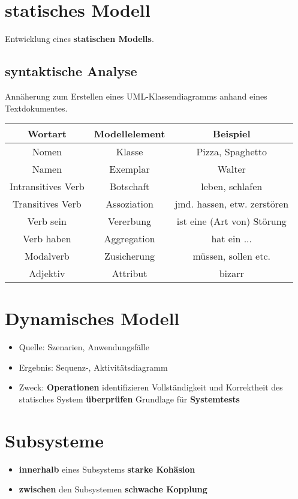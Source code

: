 \documentclass[a4paper]{article}
\theoremstyle{break}
\begin{document}
\section{statisches Modell}
Entwicklung eines \textbf{statischen Modells}. 
\subsection{syntaktische Analyse}
Annäherung zum Erstellen eines UML-Klassendiagramms anhand eines Textdokumentes.
	
\begin{tabular}{|c|c|c|}
	\hline 
	\textbf{Wortart} & \textbf{Modellelement} & \textbf{Beispiel} \\
	\hline 
	Nomen & Klasse & Pizza, Spaghetto \\ 
	\hline 
	Namen & Exemplar & Walter \\ 
	\hline 
	Intransitives Verb & Botschaft & leben, schlafen  \\ 
	\hline 
	Transitives Verb & Assoziation & jmd. hassen, etw. zerstören \\ 
	\hline 
	Verb sein & Vererbung & ist eine (Art von) Störung  \\ 
	\hline 
	Verb haben & Aggregation & hat ein ...  \\ 
	\hline 
	Modalverb & Zusicherung  & müssen, sollen etc.  \\ 
	\hline 
	Adjektiv & Attribut & bizarr  \\ 
	\hline 
\end{tabular}
 
\section{Dynamisches Modell}
\begin{itemize}
	\item Quelle: Szenarien, Anwendungsfälle
	\item Ergebnis: Sequenz-, Aktivitätsdiagramm
	\item Zweck:
	\subitem  \textbf{Operationen} identifizieren
	\subitem Vollständigkeit und Korrektheit des statisches System \textbf{überprüfen}
	\subitem Grundlage für \textbf{Systemtests}
\end{itemize}
\section{Subsysteme}
\begin{itemize}
	\item \textbf{innerhalb} eines Subsystems \textbf{starke Kohäsion}
	\item \textbf{zwischen} den Subsystemen \textbf{schwache Kopplung}
\end{itemize}
\end{document}
